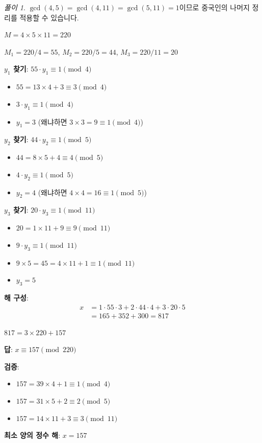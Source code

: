 \documentclass[11pt,a4paper]{article}
\theoremstyle{definition}
\theoremstyle{remark}
\newtheorem*{solution}{풀이}
\begin{document}
\begin{solution}

$\gcd(4, 5) = \gcd(4, 11) = \gcd(5, 11) = 1$이므로 중국인의 나머지 정리를 적용할 수 있습니다.

$M = 4 \times 5 \times 11 = 220$

$M_1 = 220/4 = 55$, $M_2 = 220/5 = 44$, $M_3 = 220/11 = 20$

\textbf{$y_1$ 찾기}: $55 \cdot y_1 \equiv 1 \pmod{4}$
\begin{itemize}
    \item $55 = 13 \times 4 + 3 \equiv 3 \pmod{4}$
    \item $3 \cdot y_1 \equiv 1 \pmod{4}$
    \item $y_1 = 3$ (왜냐하면 $3 \times 3 = 9 \equiv 1 \pmod{4}$)
\end{itemize}

\textbf{$y_2$ 찾기}: $44 \cdot y_2 \equiv 1 \pmod{5}$
\begin{itemize}
    \item $44 = 8 \times 5 + 4 \equiv 4 \pmod{5}$
    \item $4 \cdot y_2 \equiv 1 \pmod{5}$
    \item $y_2 = 4$ (왜냐하면 $4 \times 4 = 16 \equiv 1 \pmod{5}$)
\end{itemize}

\textbf{$y_3$ 찾기}: $20 \cdot y_3 \equiv 1 \pmod{11}$
\begin{itemize}
    \item $20 = 1 \times 11 + 9 \equiv 9 \pmod{11}$
    \item $9 \cdot y_3 \equiv 1 \pmod{11}$
    \item $9 \times 5 = 45 = 4 \times 11 + 1 \equiv 1 \pmod{11}$
    \item $y_3 = 5$
\end{itemize}

\textbf{해 구성}:
\begin{align*}
x &= 1 \cdot 55 \cdot 3 + 2 \cdot 44 \cdot 4 + 3 \cdot 20 \cdot 5 \\
  &= 165 + 352 + 300 = 817
\end{align*}

$817 = 3 \times 220 + 157$

\textbf{답}: $x \equiv 157 \pmod{220}$

\textbf{검증}:
\begin{itemize}
    \item $157 = 39 \times 4 + 1 \equiv 1 \pmod{4}$ \checkmark
    \item $157 = 31 \times 5 + 2 \equiv 2 \pmod{5}$ \checkmark
    \item $157 = 14 \times 11 + 3 \equiv 3 \pmod{11}$ \checkmark
\end{itemize}

\textbf{최소 양의 정수 해}: $x = 157$
\end{solution}
\end{document}
